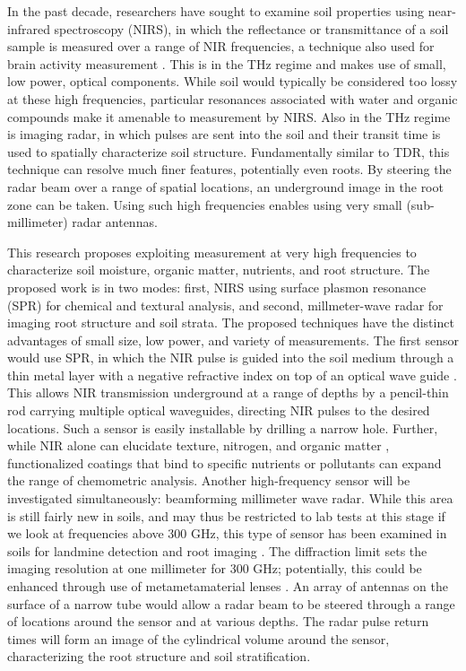 \documentclass[10pt,letterpaper]{article}
\begin{document}
In the past decade, researchers have sought to examine soil properties using near-infrared spectroscopy (NIRS), in which the reflectance or transmittance of a soil sample is measured over a range of NIR frequencies, a technique also used for brain activity measurement \cite{matsuyama2009design}. This is in the THz regime and makes use of small, low power, optical components. While soil would typically be considered too lossy at these high frequencies, particular resonances associated with water and organic compounds make it amenable to measurement by NIRS. Also in the THz regime is imaging radar, in which pulses are sent into the soil and their transit time is used to spatially characterize soil structure. Fundamentally similar to TDR, this technique can resolve much finer features, potentially even roots. By steering the radar beam over a range of spatial locations, an underground image in the root zone can be taken. Using such high frequencies enables using very small (sub-millimeter) radar antennas.

This research proposes exploiting measurement at very high frequencies to characterize soil moisture, organic matter, nutrients, and root structure. The proposed work is in two modes: first, NIRS using surface plasmon resonance (SPR) for chemical and textural analysis, and second, millmeter-wave radar for imaging root structure and soil strata. The proposed techniques have the distinct advantages of small size, low power, and variety of measurements. The first sensor would use SPR, in which the NIR pulse is guided into the soil medium through a thin metal layer with a negative refractive index on top of an optical wave guide \cite{shibayama2016surface}. This allows NIR transmission underground at a range of depths by a pencil-thin rod carrying multiple optical waveguides, directing NIR pulses to the desired locations. Such a sensor is easily installable by drilling a narrow hole. Further, while NIR alone can elucidate texture, nitrogen, and organic matter \cite{chang2001near, sorensen2005determination}, functionalized coatings that bind to specific nutrients or pollutants can expand the range of chemometric analysis. Another high-frequency sensor will be investigated simultaneously: beamforming millimeter wave radar. While this area is still fairly new in soils, and may thus be restricted to lab tests at this stage if we look at frequencies above 300 GHz, this type of sensor has been examined in soils for landmine detection \cite{du2006millimeter} and root imaging \cite{dworak2011application}. The diffraction limit sets the imaging resolution at one millimeter for 300 GHz; potentially, this could be enhanced through use of metametamaterial lenses \cite{zhang2008superlenses}. An array of antennas on the surface of a narrow tube would allow a radar beam to be steered through a range of locations around the sensor and at various depths. The radar pulse return times will form an image of the cylindrical volume around the sensor, characterizing the root structure and soil stratification.
\end{document}
